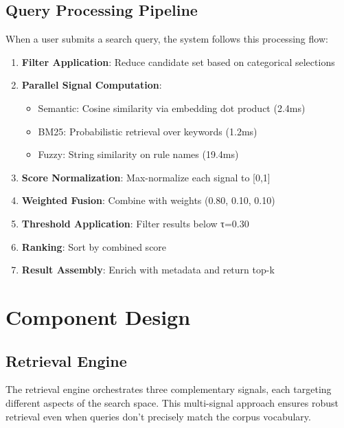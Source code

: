 \subsection{Query Processing Pipeline}

When a user submits a search query, the system follows this processing flow:

\begin{enumerate}[leftmargin=*,itemsep=2pt,topsep=2pt]
  \item \textbf{Filter Application}: Reduce candidate set based on categorical selections
  \item \textbf{Parallel Signal Computation}:
     \begin{itemize}
       \item Semantic: Cosine similarity via embedding dot product (2.4ms)
       \item BM25: Probabilistic retrieval over keywords (1.2ms)
       \item Fuzzy: String similarity on rule names (19.4ms)
     \end{itemize}
  \item \textbf{Score Normalization}: Max-normalize each signal to [0,1]
  \item \textbf{Weighted Fusion}: Combine with weights (0.80, 0.10, 0.10)
  \item \textbf{Threshold Application}: Filter results below τ=0.30
  \item \textbf{Ranking}: Sort by combined score
  \item \textbf{Result Assembly}: Enrich with metadata and return top-k
\end{enumerate}

\section{Component Design}

\subsection{Retrieval Engine}

The retrieval engine orchestrates three complementary signals, each targeting different aspects of the search space. This multi-signal approach ensures robust retrieval even when queries don't precisely match the corpus vocabulary.


